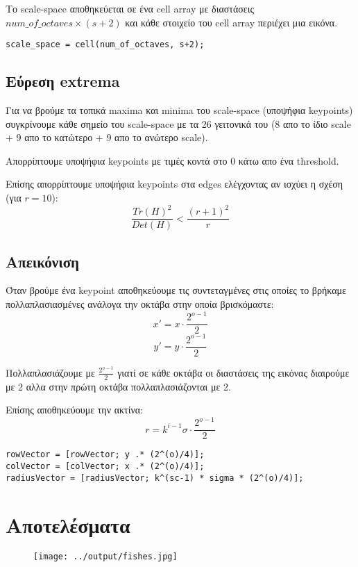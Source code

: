 \documentclass[11pt]{scrartcl} %
\begin{document}
Το scale-space αποθηκεύεται σε ένα cell array με διαστάσεις $num\_of\_octaves \times (s+2)$ και κάθε στοιχείο του cell array περιέχει μια εικόνα.
\begin{verbatim}
scale_space = cell(num_of_octaves, s+2);
\end{verbatim}

\subsection{Εύρεση extrema}

Για να βρούμε τα τοπικά maxima και minima του scale-space (υποψήφια keypoints) συγκρίνουμε κάθε σημείο του scale-space με τα 26 γειτονικά του (8 απο το ίδιο scale + 9 απο το κατώτερο + 9 απο το ανώτερο scale).

Απορρίπτουμε υποψήφια keypoints με τιμές κοντά στο 0 κάτω απο ένα threshold.

Επίσης απορρίπτουμε υποψήφια keypoints στα edges ελέγχοντας αν ισχύει η σχέση (για $r = 10$):
\[\frac{Tr(H)^2}{Det(H)} < \frac{(r+1)^2}{r}\]

\subsection{Απεικόνιση}

Όταν βρούμε ένα keypoint αποθηκεύουμε τις συντεταγμένες στις οποίες το βρήκαμε πολλαπλασιασμένες ανάλογα την οκτάβα στην οποία βρισκόμαστε:
\[x' = x \cdot \frac{2^{o-1}}{2}\]
\[y' = y \cdot \frac{2^{o-1}}{2}\]

Πολλαπλασιάζουμε με $\frac{2^{o-1}}{2}$ γιατί σε κάθε οκτάβα οι διαστάσεις της εικόνας διαιρούμε με 2 αλλα στην πρώτη οκτάβα πολλαπλασιάζονται με 2.

Επίσης αποθηκεύουμε την ακτίνα:
\[r = k^{i-1} \sigma \cdot \frac{2^{o-1}}{2}\]

\begin{verbatim}
rowVector = [rowVector; y .* (2^(o)/4)];
colVector = [colVector; x .* (2^(o)/4)];
radiusVector = [radiusVector; k^(sc-1) * sigma * (2^(o)/4)];
\end{verbatim}

\section{Αποτελέσματα}

\begin{figure}[H]
  \centerline{\texttt{[image: ../output/fishes.jpg]}}
  \caption{}
\end{figure}
\end{document}
